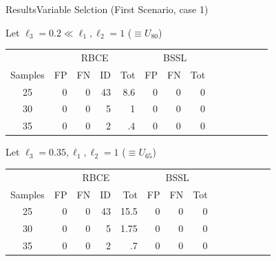 \documentclass[aspectratio=169]{beamer}					%
\begin{document}

\begin{frame}{Results}{Variable Selction (First Scenario, case 1)}

Let \alert{$\ell_3 = 0.2 \ll \ell_1,\ell_2 = 1$ ($\equiv U_{80}$)}

\begin{table}[h]
    \centering
    \begin{tabular}{|c||rrr|r||rr|r||rr|r||rr|r|}
  \hline
  &\multicolumn{4}{c||}{RBCE}&\multicolumn{3}{c|}{BSSL}\\
  \cline{2-14}
 Samples & FP & FN & ID & Tot & FP & FN & Tot \\ 
  \hline
25 &   0 &   0 &  43 & 8.6 &   0 &   0&   0  \\ 
  30 &   0 &   0 &   5 & 1 &   0 &   0 &   0 \\ 
  35 &   0 &   0 &   2 & .4 &   0 &   0 &   0 \\ 
  \hline
\end{tabular}
\end{table}
\pause
Let \alert{$\ell_3 = 0.35, \ell_1,\ell_2 = 1$ ($\equiv U_{65}$)}

\begin{table}[h]
    \centering
    \begin{tabular}{|c||rrr|r||rr|r||rr|r||rr|r|}
  \hline
  &\multicolumn{4}{c||}{RBCE}&\multicolumn{3}{c|}{BSSL}\\
  \cline{2-14}
 Samples & FP & FN & ID & Tot & FP & FN & Tot \\ 
  \hline
25 &   0 &   0 &  43 & 15.5 &   0 &   0&   0  \\ 
  30 &   0 &   0 &   5 & 1.75 &   0 &   0 &   0 \\ 
  35 &   0 &   0 &   2 & .7 &   0 &   0 &   0 \\ 
  \hline
\end{tabular}
\end{table}

\end{frame}
\end{document}
